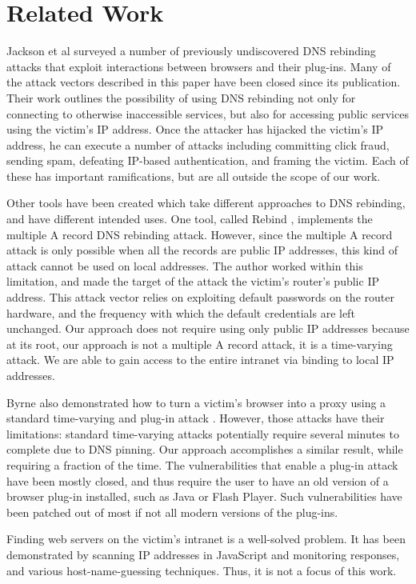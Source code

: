 \section{Related Work}
\label{sec:related}


Jackson et al \cite{protectFromDNS} surveyed a number of previously undiscovered DNS rebinding attacks that exploit interactions between browsers and their plug-ins. Many of the attack vectors described in this paper have been closed since its publication. Their work outlines the possibility of using DNS rebinding not only for connecting to otherwise inaccessible services, but also for accessing public services using the victim's IP address. Once the attacker has hijacked the victim's IP address, he can execute a number of attacks including committing click fraud, sending spam, defeating IP-based authentication, and framing the victim. Each of these has important ramifications, but are all outside the scope of our work.

Other tools have been created which take different approaches to DNS rebinding, and have different intended uses. One tool, called Rebind \cite{rebind}, implements the multiple A record DNS rebinding attack. However, since the multiple A record attack is only possible when all the records are public IP addresses, this kind of attack cannot be used on local addresses. The author worked within this limitation, and made the target of the attack the victim's router's public IP address. This attack vector relies on exploiting default passwords on the router hardware, and the frequency with which the default credentials are left unchanged. Our approach does not require using only public IP addresses because at its root, our approach is not a multiple A record attack, it is a time-varying attack.  We are able to gain access to the entire intranet via binding to local IP addresses.

Byrne also demonstrated how to turn a victim's browser into a proxy using a standard time-varying and plug-in attack \cite{blackhat}. However, those attacks have their limitations: standard time-varying attacks potentially require several minutes to complete due to DNS pinning. Our approach accomplishes a similar result, while requiring a fraction of the time. The vulnerabilities that enable a plug-in attack have been mostly closed, and thus require the user to have an old version of a browser plug-in installed, such as Java or Flash Player. Such vulnerabilities have been patched out of most if not all modern versions of the plug-ins.

Finding web servers on the victim's intranet is a well-solved problem. It has been demonstrated by scanning IP addresses in JavaScript and monitoring responses\cite{grossman}, and various host-name-guessing techniques\cite{protectFromDNS}. Thus, it is not a focus of this work.


